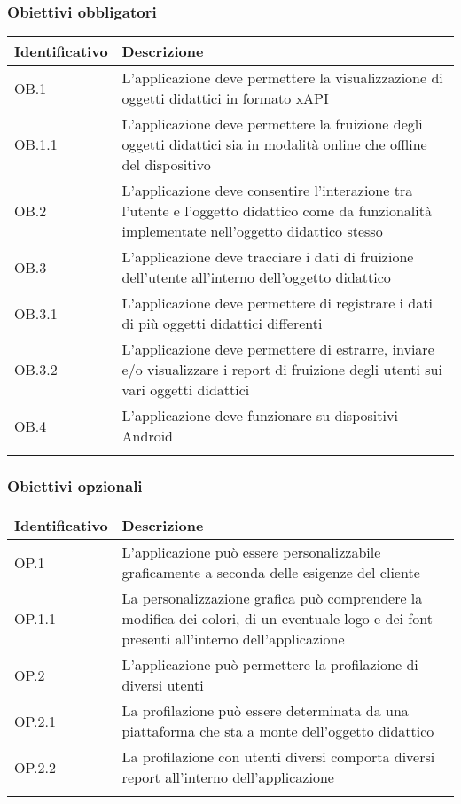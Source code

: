 \documentclass[../Tesi.tex]{subfiles}
\begin{document}
		\subsubsection{Obiettivi obbligatori}
			\begin{longtabu} to \textwidth {X[0.3cm] X}
				\toprule
				\textbf{Identificativo} & \textbf{Descrizione} \\
				\midrule
				\endhead
				OB.1 & L’applicazione deve permettere la visualizzazione di oggetti didattici in formato xAPI \\
				\midrule
				OB.1.1 & L’applicazione deve permettere la fruizione degli oggetti didattici sia in modalità online che offline del dispositivo \\
				\midrule
				OB.2 & L’applicazione deve consentire l’interazione tra l’utente e l’oggetto didattico come da funzionalità implementate nell’oggetto didattico stesso \\
				\midrule
				OB.3 & L’applicazione deve tracciare i dati di fruizione dell’utente all’interno dell’oggetto didattico \\
				\midrule
				OB.3.1 & L’applicazione deve permettere di registrare i dati di più oggetti didattici differenti \\
				\midrule
				OB.3.2 & L’applicazione deve permettere di estrarre, inviare e/o visualizzare i report di fruizione degli utenti sui vari oggetti didattici \\
				\midrule
				OB.4 & L’applicazione deve funzionare su dispositivi Android \\
				\bottomrule
			\end{longtabu}

			\subsubsection{Obiettivi opzionali}
			\begin{longtabu} to \textwidth {X[0.3cm] X}
				\toprule
				\textbf{Identificativo} & \textbf{Descrizione} \\
				\midrule
				\endhead
				OP.1 & L’applicazione può essere personalizzabile graficamente a seconda delle esigenze del cliente  \\
				\midrule
				OP.1.1 & La personalizzazione grafica può comprendere la modifica dei colori, di un eventuale logo e dei font presenti all’interno dell’applicazione  \\
				\midrule
				OP.2 & L’applicazione può permettere la profilazione di diversi utenti  \\
				\midrule
				OP.2.1 & La profilazione può essere determinata da una piattaforma che sta a monte dell’oggetto didattico  \\
				\midrule
				OP.2.2 & La profilazione con utenti diversi comporta diversi report all’interno dell’applicazione \\
				\bottomrule
			\end{longtabu}
\end{document}
